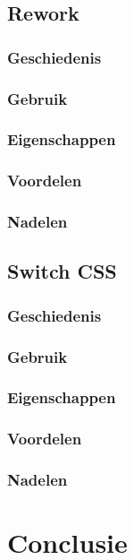 \documentclass[pdftex,a4paper,12pt,twoside]{report}
\begin{document}
\section{Rework}
\subsection{Geschiedenis}
\subsection{Gebruik}
\subsection{Eigenschappen}
\subsection{Voordelen}
\subsection{Nadelen}


\section{Switch CSS}
\subsection{Geschiedenis}
\subsection{Gebruik}
\subsection{Eigenschappen}
\subsection{Voordelen}
\subsection{Nadelen}




\chapter{Conclusie}
\label{ch:conclusie}

\lipsum[76-80]






\listoffigures
\listoftables
\end{document}
